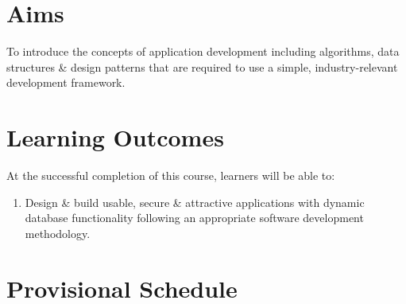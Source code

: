\documentclass{article}
\begin{document}
\section*{Aims}
To introduce the concepts of application development including algorithms, data structures \& design patterns that are required to use a simple, industry-relevant development framework.

\section*{Learning Outcomes}
At the successful completion of this course, learners will be able to:
\begin{enumerate}
	\item Design \& build usable, secure \& attractive applications with dynamic database functionality following an appropriate software development methodology.
\end{enumerate}

\section*{Provisional Schedule}
\end{document}
